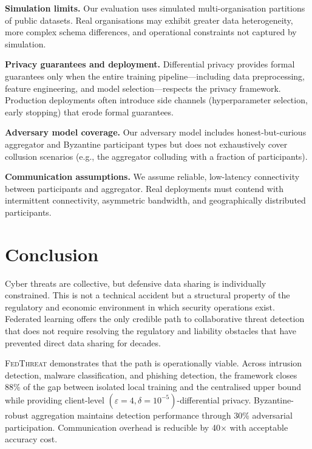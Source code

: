 \documentclass[sigconf,nonacm]{acmart}
\begin{document}
\textbf{Simulation limits.} Our evaluation uses simulated multi-organisation
partitions of public datasets. Real organisations may exhibit greater data
heterogeneity, more complex schema differences, and operational constraints
not captured by simulation.

\textbf{Privacy guarantees and deployment.} Differential privacy provides
formal guarantees only when the entire training pipeline---including data
preprocessing, feature engineering, and model selection---respects the
privacy framework. Production deployments often introduce side channels
(hyperparameter selection, early stopping) that erode formal guarantees.

\textbf{Adversary model coverage.} Our adversary model includes
honest-but-curious aggregator and Byzantine participant types but does not
exhaustively cover collusion scenarios (e.g., the aggregator colluding
with a fraction of participants).

\textbf{Communication assumptions.} We assume reliable, low-latency
connectivity between participants and aggregator. Real deployments must
contend with intermittent connectivity, asymmetric bandwidth, and
geographically distributed participants.

\section{Conclusion}

Cyber threats are collective, but defensive data sharing is individually
constrained. This is not a technical accident but a structural property
of the regulatory and economic environment in which security operations
exist. Federated learning offers the only credible path to collaborative
threat detection that does not require resolving the regulatory and
liability obstacles that have prevented direct data sharing for decades.

\textsc{FedThreat} demonstrates that the path is operationally viable.
Across intrusion detection, malware classification, and phishing detection,
the framework closes 88\% of the gap between isolated local training and
the centralised upper bound while providing client-level
$(\varepsilon=4, \delta=10^{-5})$-differential privacy. Byzantine-robust
aggregation maintains detection performance through 30\% adversarial
participation. Communication overhead is reducible by 40$\times$ with
acceptable accuracy cost.
\end{document}
